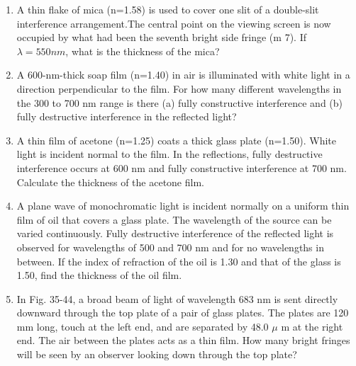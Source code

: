 \documentclass[fleqn]{article}
\begin{document}
\begin{enumerate}
    \item A thin flake of mica (n=1.58) is used to cover one slit of a double-slit interference arrangement.The central point on the viewing screen is now occupied by what had been the seventh bright side fringe (m  7). If $\lambda=550 nm$, what is the thickness of the mica?

    \item A 600-nm-thick soap film (n=1.40) in air is illuminated with white light in a direction perpendicular to the film. For how many different wavelengths in the 300 to 700 nm range is there (a) fully constructive interference and (b) fully destructive interference in the reflected light?

    \item A thin film of acetone (n=1.25) coats a thick glass plate (n=1.50). White light is incident normal to the film. In the reflections, fully destructive interference occurs at 600 nm and fully constructive interference at 700 nm. Calculate the thickness of the acetone film.

    \item A plane wave of monochromatic light is incident normally on a uniform thin film of oil that covers a glass plate. The wavelength of the source can be varied continuously. Fully destructive interference of the reflected light is observed for wavelengths of 500 and 700 nm and for no wavelengths in between. If the index of refraction of the oil is 1.30 and that of the glass is 1.50, find the thickness of the oil film.
    
    \item In Fig. 35-44, a broad beam of light of wavelength 683 nm is sent directly downward through the top plate of a pair of glass plates. The plates are 120 mm long, touch at the left end, and are separated by 48.0 $\mu$ m at the right end. The air between the plates acts as a thin film. How many bright fringes will be seen by an observer looking down through the top plate?
    
  \end{enumerate}
\end{document}
